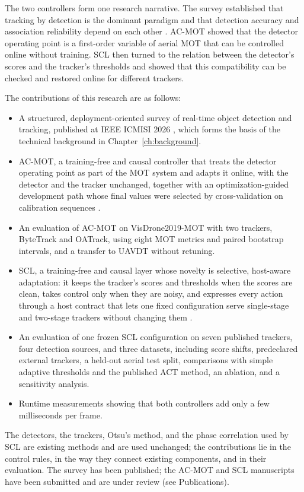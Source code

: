 The two controllers form one research narrative. The survey established that tracking by detection is the dominant paradigm and that detection accuracy and association reliability depend on each other \cite{ismail2026realtime}. AC-MOT showed that the detector operating point is a first-order variable of aerial MOT that can be controlled online without training. SCL then turned to the relation between the detector's scores and the tracker's thresholds and showed that this compatibility can be checked and restored online for different trackers.

The contributions of this research are as follows:
\begin{itemize}
\item A structured, deployment-oriented survey of real-time object detection and tracking, published at IEEE ICMISI 2026 \cite{ismail2026realtime}, which forms the basis of the technical background in Chapter~\ref{ch:background}.
\item AC-MOT, a training-free and causal controller that treats the detector operating point as part of the MOT system and adapts it online, with the detector and the tracker unchanged, together with an optimization-guided development path whose final values were selected by cross-validation on calibration sequences \cite{ismail2026acmot}.
\item An evaluation of AC-MOT on VisDrone2019-MOT with two trackers, ByteTrack and OATrack, using eight MOT metrics and paired bootstrap intervals, and a transfer to UAVDT without retuning.
\item SCL, a training-free and causal layer whose novelty is selective, host-aware adaptation: it keeps the tracker's scores and thresholds when the scores are clean, takes control only when they are noisy, and expresses every action through a host contract that lets one fixed configuration serve single-stage and two-stage trackers without changing them \cite{ismail2026scl}.
\item An evaluation of one frozen SCL configuration on seven published trackers, four detection sources, and three datasets, including score shifts, predeclared external trackers, a held-out aerial test split, comparisons with simple adaptive thresholds and the published ACT method, an ablation, and a sensitivity analysis.
\item Runtime measurements showing that both controllers add only a few milliseconds per frame.
\end{itemize}
The detectors, the trackers, Otsu's method, and the phase correlation used by SCL are existing methods and are used unchanged; the contributions lie in the control rules, in the way they connect existing components, and in their evaluation. The survey has been published; the AC-MOT and SCL manuscripts have been submitted and are under review (see Publications).


